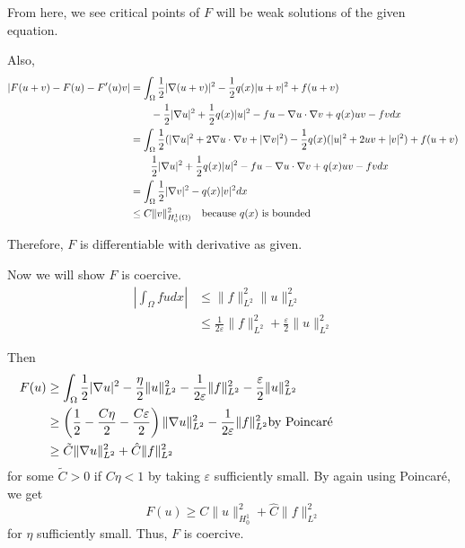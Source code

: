 \documentclass[a4paper]{article}
\begin{document}
\begin{enumerate}
    From here, we see critical points of $F$ will be weak solutions of the given equation.

    Also,
    \begin{align*}
      | F(u+v) - F(u) - F'(u)v | &= \int_{\Omega}^{} \frac{1}{2} | \nabla (u+v) |^2 - \frac{1}{2} q(x) |u+v|^2 + f(u+v) \\
      &\quad \quad - \frac{1}{2} |\nabla u|^2 + \frac{1}{2} q(x) |u|^2 - f u - \nabla u \cdot \nabla v + q(x) uv - fv dx \\
      &= \int_{\Omega}^{} \frac{1}{2} ( | \nabla u |^2 + 2 \nabla u \cdot \nabla v + | \nabla v |^2 ) - \frac{1}{2} q(x) ( |u|^2 + 2uv + |v|^2) + f(u + v) \\
      &\quad \quad \frac{1}{2} |\nabla u|^2 + \frac{1}{2} q(x) |u|^2 - fu - \nabla u \cdot \nabla v + q(x) uv - fv dx \\
      &= \int_{\Omega}^{} \frac{1}{2} |\nabla v|^2 - q(x) |v|^2 dx \\
      &\leq C \|v\|_{H_0^1(\Omega)}^2 \quad \parbox{5cm}{because $q(x)$ is bounded}
    \end{align*}

    Therefore, $F$ is differentiable with derivative as given.

    Now we will show $F$ is coercive.
    \begin{align*}
      \left| \int_{\Omega}^{} fu dx \right| &\leq \|f\|_{L^2}^2 \|u\|_{L^2}^2 \\
      &\leq \frac{1}{2 \varepsilon} \|f\|_{L^2}^2 + \frac{\varepsilon}{2} \|u\|_{L^2}^2
    \end{align*}

    Then
    \begin{align*}
      F(u) &\geq \int_{\Omega}^{} \frac{1}{2} | \nabla u|^2 - \frac{\eta}{2} \|u\|_{L^2}^2 - \frac{1}{2 \varepsilon} \|f\|_{L^2}^2 -
      \frac{\varepsilon}{2} \|u\|_{L^2}^2 \\
      &\geq \left( \frac{1}{2} - \frac{C \eta}{2} - \frac{C \varepsilon}{2} \right) \|\nabla u\|_{L^2}^2 - \frac{1}{2\varepsilon} \|f\|_{L^2}^2
      \parbox{5cm}{by Poincar\'{e}} \\
      &\geq \tilde{C} \|\nabla u\|_{L^2}^2 + \hat{C} \|f\|_{L^2}^2
    \end{align*}
    for some $\tilde{C} >0$ if $C \eta < 1$ by taking $\varepsilon$ sufficiently small. By again using Poincar\'{e}, we get
    \[ F(u) \geq C \|u\|_{H^1_0}^2 + \hat{C} \|f\|_{L^2}^2 \]
    for $\eta$ sufficiently small. Thus, $F$ is coercive.


\end{enumerate}
\end{document}
